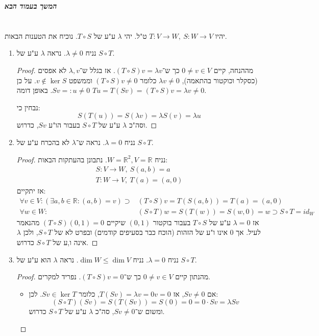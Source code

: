 \documentclass[]{article}
\newcommand\npage {\vfil {\hfil \textbf{\textit{המשך בעמוד הבא}}} \hfil \vfil \pagebreak}
\newcommand\R     {\mathbb{R}}
\newcommand\co        {\colon}
\renewcommand\lg      {\lambda}
\theoremstyle{definition}
\begin{document}
	\npage
	\section{}
	יהיו $T \co V \to W, \ S \co W \to V$ ט"ל. יהי $\lg$ ע"ע של $T \circ S$. נוכיח את הטענות הבאות. 
	\begin{enumerate}
		\item נניח $\lg \neq 0$. נראה $\lg$ ע"ע של $S \circ T$. \begin{proof}
			מההנחה, קיים $0 \neq v \in V$ כך ש־$(T \circ S)v = \lg v$. אז בגלל ש־$\lg, v$ לא אפסים (כסקלר וכוקטור בהתאמה), $\lg v \neq 0$ כלומר $(T \circ S)v \neq 0$ וממשפט $v \notin \ker S$. על כן $Sv =: u \neq 0$. באופן דומה $Tu = T(Sv) = (T \circ S)v = \lg v \neq 0$. 
			
			נבחין כי: 
		\[ S(T(u)) = S(\lg v) = \lg S(v) = \lg u \]
		וסה"כ $\lg$ ע"ע של $S \circ T$ בעבור הו"ע $Sv$, כדרוש. 
		\end{proof}
		\item נניח $\lg = 0$. נראה ש־$\lg$ לא בהכרח ע"ע של $S \circ T$. 
		\begin{proof}
			נניח $W = \R^2, V = \R$. נתבונן בהעתקות הבאות: 
			\begin{gather*}
				S \co V \to W, \ S(a, b) = a \\
				T \co W \to V, \ T(a) = (a, 0)
			\end{gather*}
			אז יתקיים: 
			\begin{align*}
				\forall v \in V\co (\exists a, b \in \R \co (a, b) = v) \supset
				&(T \circ S)v = T(S(a, b)) = T(a) = (a, 0) \\
				\forall w \in W \co &(S \circ T)w = S(T(w)) = S(w, 0) = w \supset S \circ T = id_{W}
			\end{align*}
			אז $\lg = 0$ ע"ע של $T \circ S$ בעבור בוקטור $(0, 1)$ שיקיים $(T \circ S)(0, 1) = 0$ מהנאמר לעיל. אך $0$ אינו ו"ע של הזהות (הוכח כבר בסעיפים קודמים) ובפרט לא של $S \circ T$, ולכן $\lg$ אינה ו,ע של $S \circ T$ כדרוש. 
		\end{proof}
		\item נניח $\lg = 0$. נניח $\dim W \le \dim V$. נראה $\lg$ הוא ע"ע של $S \circ T$. 
		\begin{proof}
			מהנתון קיים $0 \neq v \in V$ כך ש־$(T \circ S)v = 0$. נפריד למקרים. 
			\begin{itemize}
				\item אם $Sv \neq 0$, אז $T(Sv) = \lg v = 0v = 0$, כלומר $Sv \in \ker T$. לכן: 
				\[ (S \circ T)(Sv) = S(T(Sv)) = S(0) = 0 = 0 \cdot Sv = \lg Sv \]
				ומשום ש־$Sv \neq 0$, סה"כ $\lg$ ע"ע של $S \circ T$ כדרוש. 

\end{itemize}
\end{proof}
\end{enumerate}
\end{document}
